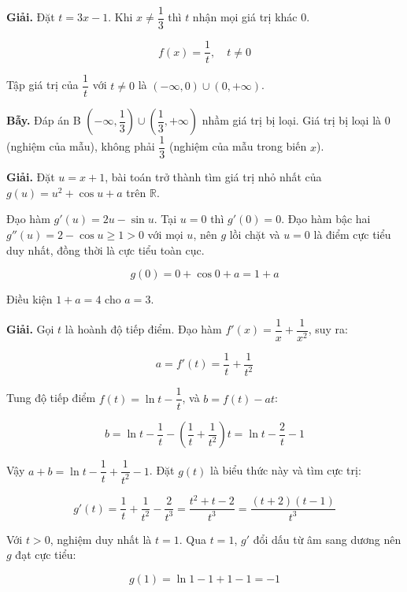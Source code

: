 \documentclass[11pt, a4paper]{article}
\begin{document}
\begin{dapan}[3 — Đáp án C]
\textbf{Giải.} Đặt $t = 3x - 1$. Khi $x \ne \dfrac{1}{3}$ thì $t$ nhận mọi giá trị khác $0$.

$$f(x) = \frac{1}{t}, \quad t \ne 0$$

Tập giá trị của $\dfrac{1}{t}$ với $t \ne 0$ là $(-\infty, 0) \cup (0, +\infty)$.

\textbf{Bẫy.} Đáp án B $\left(-\infty, \dfrac{1}{3}\right) \cup \left(\dfrac{1}{3}, +\infty\right)$ nhầm giá trị bị loại. Giá trị bị loại là $0$ (nghiệm của mẫu), không phải $\dfrac{1}{3}$ (nghiệm của mẫu trong biến $x$).
\end{dapan}

\begin{dapan}[4 — Đáp án A]
\textbf{Giải.} Đặt $u = x + 1$, bài toán trở thành tìm giá trị nhỏ nhất của $g(u) = u^2 + \cos u + a$ trên $\mathbb{R}$.

Đạo hàm $g'(u) = 2u - \sin u$. Tại $u = 0$ thì $g'(0) = 0$. Đạo hàm bậc hai $g''(u) = 2 - \cos u \ge 1 > 0$ với mọi $u$, nên $g$ lồi chặt và $u = 0$ là điểm cực tiểu duy nhất, đồng thời là cực tiểu toàn cục.

$$g(0) = 0 + \cos 0 + a = 1 + a$$

Điều kiện $1 + a = 4$ cho $a = 3$.
\end{dapan}

\begin{dapan}[5 — Đáp án A]
\textbf{Giải.} Gọi $t$ là hoành độ tiếp điểm. Đạo hàm $f'(x) = \dfrac{1}{x} + \dfrac{1}{x^2}$, suy ra:

$$a = f'(t) = \frac{1}{t} + \frac{1}{t^2}$$

Tung độ tiếp điểm $f(t) = \ln t - \dfrac{1}{t}$, và $b = f(t) - a t$:

$$b = \ln t - \frac{1}{t} - \left(\frac{1}{t} + \frac{1}{t^2}\right)t = \ln t - \frac{2}{t} - 1$$

Vậy $a + b = \ln t - \dfrac{1}{t} + \dfrac{1}{t^2} - 1$. Đặt $g(t)$ là biểu thức này và tìm cực trị:

$$g'(t) = \frac{1}{t} + \frac{1}{t^2} - \frac{2}{t^3} = \frac{t^2 + t - 2}{t^3} = \frac{(t+2)(t-1)}{t^3}$$

Với $t > 0$, nghiệm duy nhất là $t = 1$. Qua $t = 1$, $g'$ đổi dấu từ âm sang dương nên $g$ đạt cực tiểu:

$$g(1) = \ln 1 - 1 + 1 - 1 = -1$$
\end{dapan}
\end{document}
